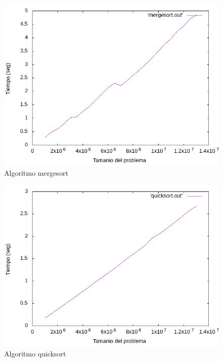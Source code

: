 \documentclass[12pt,spanish]{article}
\begin{document}
\begin{figure}[H]
\centering
\includegraphics[scale=0.75]{empirica_mergesort.png}
\caption{Algoritmo mergesort}
\end{figure}

\begin{figure}[H]
\centering
\includegraphics[scale=0.75]{empirica_quicksort.png}
\caption{Algoritmo quicksort}
\end{figure}
\end{document}
